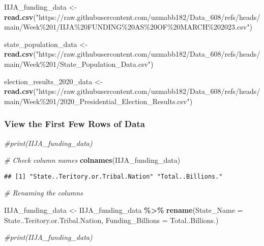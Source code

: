 \documentclass[
]{article}
\newenvironment{Shaded}{\begin{snugshade}}{\end{snugshade}}
\newcommand{\AttributeTok}[1]{\textcolor[rgb]{0.13,0.29,0.53}{#1}}
\newcommand{\CommentTok}[1]{\textcolor[rgb]{0.56,0.35,0.01}{\textit{#1}}}
\newcommand{\FunctionTok}[1]{\textcolor[rgb]{0.13,0.29,0.53}{\textbf{#1}}}
\newcommand{\NormalTok}[1]{#1}
\newcommand{\OtherTok}[1]{\textcolor[rgb]{0.56,0.35,0.01}{#1}}
\newcommand{\SpecialCharTok}[1]{\textcolor[rgb]{0.81,0.36,0.00}{\textbf{#1}}}
\newcommand{\StringTok}[1]{\textcolor[rgb]{0.31,0.60,0.02}{#1}}
\begin{document}
\begin{Shaded}
\begin{Highlighting}[]
\NormalTok{IIJA\_funding\_data }\OtherTok{\textless{}{-}} \FunctionTok{read.csv}\NormalTok{(}\StringTok{"https://raw.githubusercontent.com/uzmabb182/Data\_608/refs/heads/main/Week\%201/IIJA\%20FUNDING\%20AS\%20OF\%20MARCH\%202023.csv"}\NormalTok{)}

\NormalTok{state\_population\_data }\OtherTok{\textless{}{-}} \FunctionTok{read.csv}\NormalTok{(}\StringTok{"https://raw.githubusercontent.com/uzmabb182/Data\_608/refs/heads/main/Week\%201/State\_Population\_Data.csv"}\NormalTok{)}


\NormalTok{election\_results\_2020\_data }\OtherTok{\textless{}{-}} \FunctionTok{read.csv}\NormalTok{(}\StringTok{"https://raw.githubusercontent.com/uzmabb182/Data\_608/refs/heads/main/Week\%201/2020\_Presidential\_Election\_Results.csv"}\NormalTok{)}
\end{Highlighting}
\end{Shaded}

\subsubsection{View the First Few Rows of
Data}\label{view-the-first-few-rows-of-data}

\begin{Shaded}
\begin{Highlighting}[]
\CommentTok{\#print(IIJA\_funding\_data)}
\end{Highlighting}
\end{Shaded}

\begin{Shaded}
\begin{Highlighting}[]
\CommentTok{\# Check column names}
\FunctionTok{colnames}\NormalTok{(IIJA\_funding\_data)}
\end{Highlighting}
\end{Shaded}

\begin{verbatim}
## [1] "State..Teritory.or.Tribal.Nation" "Total..Billions."
\end{verbatim}

\begin{Shaded}
\begin{Highlighting}[]
\CommentTok{\# Renaming the columns}

\NormalTok{IIJA\_funding\_data }\OtherTok{\textless{}{-}}\NormalTok{ IIJA\_funding\_data }\SpecialCharTok{\%\textgreater{}\%}
  \FunctionTok{rename}\NormalTok{(}\AttributeTok{State\_Name =}\NormalTok{ State..Teritory.or.Tribal.Nation, }\AttributeTok{Funding\_Billions =}\NormalTok{ Total..Billions.)}

\CommentTok{\#print(IIJA\_funding\_data)}
\end{Highlighting}
\end{Shaded}
\end{document}

